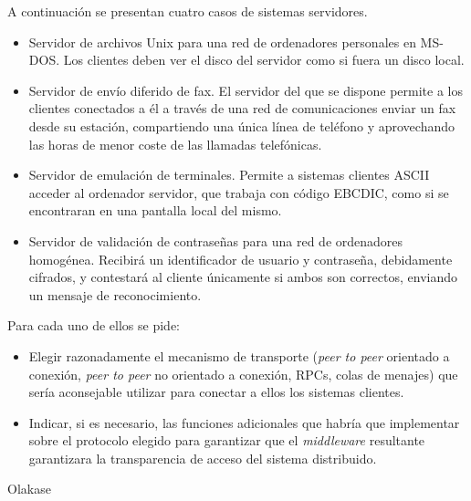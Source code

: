   \begin{problem}[14]
  A continuación se presentan cuatro casos de sistemas servidores.
  \begin{itemize}
    \item Servidor de archivos Unix para una red de ordenadores personales en MS-DOS.
    Los clientes deben ver el disco del servidor como si fuera un disco local.
    \item Servidor de envío diferido de fax. El servidor del que se dispone permite a
los clientes conectados a él a través de una red de comunicaciones enviar un
fax desde su estación, compartiendo una única línea de teléfono y aprovechando
las horas de menor coste de las llamadas telefónicas.
    \item Servidor de emulación de terminales. Permite a sistemas clientes
ASCII acceder al ordenador servidor, que trabaja con código EBCDIC, como si se
encontraran en una pantalla local del mismo.
    \item Servidor de validación de contraseñas para una red de ordenadores
homogénea. Recibirá un identificador de usuario y contraseña, debidamente
cifrados, y contestará al cliente únicamente si ambos son correctos, enviando un mensaje de reconocimiento.
  \end{itemize}
  Para cada uno de ellos se pide:
  \begin{itemize}
    \item Elegir razonadamente el mecanismo de transporte (\textit{peer to peer} orientado a conexión, \textit{peer to peer }no orientado a conexión, RPCs, colas de menajes) que sería aconsejable utilizar para conectar a ellos los sistemas clientes.
    \item Indicar, si es necesario, las funciones adicionales que 
habría que implementar sobre el protocolo elegido para garantizar que el
 \textit{middleware }resultante garantizara la transparencia de acceso del sistema distribuido.
  \end{itemize}
    \solution

    Olakase

    \end{problem}


